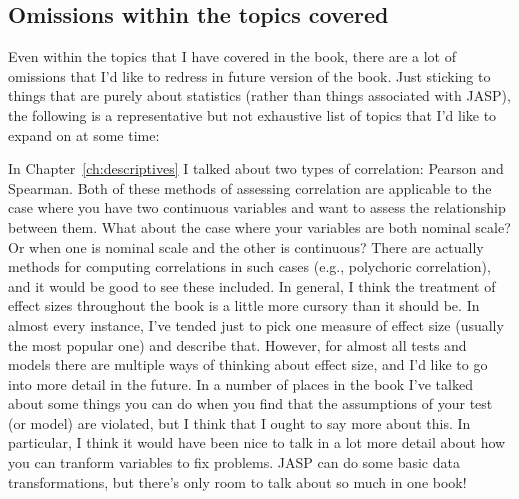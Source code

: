\subsection{Omissions within the topics covered}

Even within the topics that I have covered in the book, there are a lot of omissions that I'd like to redress in future version of the book. Just sticking to things that are purely about statistics (rather than things associated with JASP), the following is a representative but not exhaustive list of topics that I'd like to expand on at some time:
\begin{itemize}
 In Chapter~\ref{ch:descriptives} I talked about two types of correlation: Pearson and Spearman. Both of these methods of assessing correlation are applicable to the case where you have two continuous variables and want to assess the relationship between them. What about the case where your variables are both nominal scale? Or when one is nominal scale and the other is continuous? There are actually methods for computing correlations in such cases (e.g., polychoric correlation), and it would be good to see these included. 
 In general, I think the treatment of effect sizes throughout the book is a little more cursory than it should be. In almost every instance, I've tended just to pick one measure of effect size (usually the most popular one) and describe that. However, for almost all tests and models there are multiple ways of thinking about effect size, and I'd like to go into more detail in the future.
 In a number of places in the book I've talked about some things you can do when you find that the assumptions of your test (or model) are violated, but I think that I ought to say more about this. In particular, I think it would have been nice to talk in a lot more detail about how you can tranform variables to fix problems. JASP can do some basic data transformations, but there's only room to talk about so much in one book!


\end{itemize}
